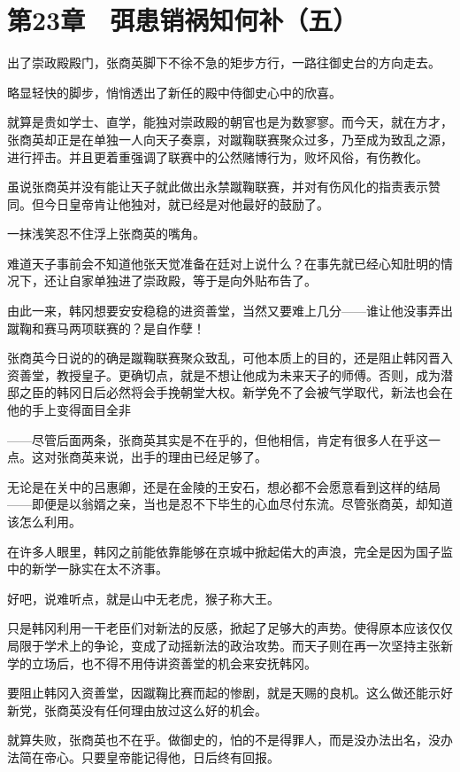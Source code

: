 \section{第23章　弭患销祸知何补（五）}

出了崇政殿殿门，张商英脚下不徐不急的矩步方行，一路往御史台的方向走去。

略显轻快的脚步，悄悄透出了新任的殿中侍御史心中的欣喜。

就算是贵如学士、直学，能独对崇政殿的朝官也是为数寥寥。而今天，就在方才，张商英却正是在单独一人向天子奏禀，对蹴鞠联赛聚众过多，乃至成为致乱之源，进行抨击。并且更着重强调了联赛中的公然赌博行为，败坏风俗，有伤教化。

虽说张商英并没有能让天子就此做出永禁蹴鞠联赛，并对有伤风化的指责表示赞同。但今日皇帝肯让他独对，就已经是对他最好的鼓励了。

一抹浅笑忍不住浮上张商英的嘴角。

难道天子事前会不知道他张天觉准备在廷对上说什么？在事先就已经心知肚明的情况下，还让自家单独进了崇政殿，等于是向外贴布告了。

由此一来，韩冈想要安安稳稳的进资善堂，当然又要难上几分——谁让他没事弄出蹴鞠和赛马两项联赛的？是自作孽！

张商英今日说的的确是蹴鞠联赛聚众致乱，可他本质上的目的，还是阻止韩冈晋入资善堂，教授皇子。更确切点，就是不想让他成为未来天子的师傅。否则，成为潜邸之臣的韩冈日后必然将会手挽朝堂大权。新学免不了会被气学取代，新法也会在他的手上变得面目全非

——尽管后面两条，张商英其实是不在乎的，但他相信，肯定有很多人在乎这一点。这对张商英来说，出手的理由已经足够了。

无论是在关中的吕惠卿，还是在金陵的王安石，想必都不会愿意看到这样的结局——即便是以翁婿之亲，当也是忍不下毕生的心血尽付东流。尽管张商英，却知道该怎么利用。

在许多人眼里，韩冈之前能依靠能够在京城中掀起偌大的声浪，完全是因为国子监中的新学一脉实在太不济事。

好吧，说难听点，就是山中无老虎，猴子称大王。

只是韩冈利用一干老臣们对新法的反感，掀起了足够大的声势。使得原本应该仅仅局限于学术上的争论，变成了动摇新法的政治攻势。而天子则在再一次坚持主张新学的立场后，也不得不用侍讲资善堂的机会来安抚韩冈。

要阻止韩冈入资善堂，因蹴鞠比赛而起的惨剧，就是天赐的良机。这么做还能示好新党，张商英没有任何理由放过这么好的机会。

就算失败，张商英也不在乎。做御史的，怕的不是得罪人，而是没办法出名，没办法简在帝心。只要皇帝能记得他，日后终有回报。

